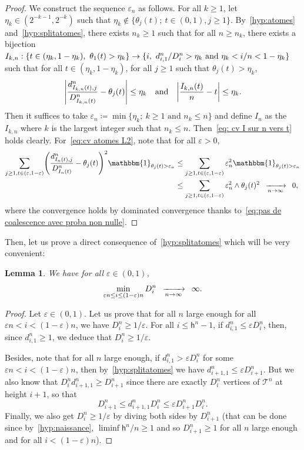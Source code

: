 \documentclass[10pt]{amsart}
\newtheorem{lemm}[theo]{Lemma}\newtheorem{prop}[theo]{Proposition}\newtheorem{coro}[theo]{Corollary}\newtheorem{conj}[theo]{Conjecture}
\theoremstyle{definition}\newtheorem{defi}[theo]{Definition}\newtheorem{rema}[theo]{Remark}\newtheorem{exam}[theo]{Example}\newtheorem{exem}[theo]{Example}\newtheorem{nota}[theo]{Notation}
\newcommand{\e}{\varepsilon}
\newcommand{\cv}[1][n]{\enskip\xrightarrow[#1 \to \infty]{}\enskip}
\newcommand{\1}{\mathbbm{1}}
\newcommand{\T}{\mathcal{T}}
\newcommand{\h}{\mathsf{h}}
\let\originalleft\left
\let\originalright\right
\renewcommand{\left}{\mathopen{}\mathclose\bgroup\originalleft}
\renewcommand{\right}{\aftergroup\egroup\originalright}
\renewcommand*{\to}{\mathchoice{\longrightarrow}{\rightarrow}{\rightarrow}{\rightarrow}}
\begin{document}
\begin{proof}
We construct the sequence $\e_n$ as follows. For all $k \ge 1$, let $\eta_k \in (2^{-k-1},2^{-k})$ such that $\eta_k \not \in \{\theta_j(t); \ t \in (0,1), j\ge 1\}$. By~\ref{hyp:atomes} and~\ref{hyp:splitatomes}, there exists $n_k\ge 1$ such that for all $n\ge n_k$, there exists a bijection~$I_{k,n}: \{t \in (\eta_k,1-\eta_k), \ \theta_1(t)> \eta_k\} \to \{i, \ d^n_{i,1}/D^n_i > \eta_k \text{ and } \eta_k < i/n < 1-\eta_k \}$ such that for all $t \in (\eta_k, 1-\eta_k)$, for all $j\ge 1$ such that $\theta_j(t)>\eta_k$,
\[
\left|\frac{d^n_{I_{k,n}(t),j}}{D^n_{I_{k,n}(t)}} - \theta_j(t) \right| \le \eta_k \quad \text{and} \quad
\left|\frac{I_{k,n}(t)}{n} -t \right| \le \eta_k.
\]
Then it suffices to take $\e_n \coloneqq \min\{\eta_k; \ k\ge 1 \text{ and } n_k \le n\}$ and define $I_n$ as the $I_{k,n}$ where $k$ is the largest integer such that $n_k \le n$. Then~\eqref{eq: cv I sur n vers t} holds clearly. For~\eqref{eq:cv atomes L2}, note that for all $\e>0$,
\begin{align*}
\sum_{j \ge 1, t\in (\e, 1-\e)}
\left(
\frac{d^n_{I_n(t), j}}{D^n_{I_n(t)}} - \theta_j(t)
\right)^2
\1_{\theta_j(t)>\e_n } &\le \sum_{j \ge 1, t\in (\e, 1-\e)} \e_n^2 \1_{\theta_j(t)>\e_n }\\
&\le \sum_{j \ge 1, t\in (\e, 1-\e)} \e_n^2\wedge \theta_j(t)^2
\cv[n] 0,
\end{align*}
where the convergence holds by dominated convergence thanks to~\eqref{eq:pas de coalescence avec proba non nulle}.
\end{proof}

Then, let us prove a direct consequence of~\ref{hyp:splitatomes} which will be very convenient:

\begin{lemm}\label{lemme profil tend vers l'infini}
We have for all $\e \in (0,1)$,
\[
\min_{ \e n \le i \le (1-\e)n} D^n_i \cv[n] \infty.
\]
\end{lemm}

\begin{proof}
Let $\e\in (0,1)$. Let us prove that for all $n$ large enough for all $\e n < i < (1-\e) n$, we have $D^n_i \ge 1/ \e$. For all $i \le \h^n -1$, if $d^n_{i,1} \le \e D^n_i$, then, since $d^n_{i,1}\ge 1$, we deduce that $D^n_i \ge 1/\e$.

Besides, note that for all $n$ large enough, if $d^n_{i,1} > \e D^n_i$ for some $\e n < i <(1-\e) n$, then by~\ref{hyp:splitatomes} we have $d^n_{i+1, 1} \le \e D^n_{i+1}$. But we also know that $D^n_i d^n_{i+1,1} \ge D^n_{i+1}$ since there are exactly $D^n_i$ vertices of $\T^n$ at height $i+1$, so that
\[
D_{i+1}^n \le d^n_{i+1,1} D^n_i \le \e D^n_{i+1} D^n_i.
\]
Finally, we also get $D^n_i \ge 1/ \e$ by diving both sides by $D_{i+1}^n$ (that can be done since by~\ref{hyp:naissance}, $\liminf \h^n/n \ge 1$ and so $D_{i+1}^n\ge 1$ for all $n$ large enough and for all $i< (1-\e) n $).
\end{proof}
\end{document}
